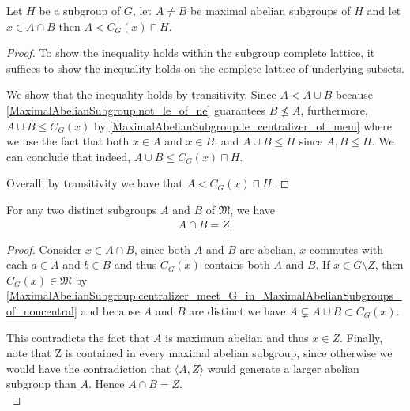 \begin{lemma}
  \label{MaximalAbelianSubgroup.lt_cen_meet_G}
  \leanok
  Let $H$ be a subgroup of $G$, let $A \ne B$ be maximal abelian subgroups of $H$ and let $x \in A \cap B$ then $A < C_G(x) \sqcap H$.
\end{lemma}
\begin{proof}
  \leanok
  To show the inequality holds within the subgroup complete lattice, 
  it suffices to show the inequality holds on the complete lattice of underlying subsets.
  
  We show that the inequality holds by transitivity. 
  Since $A < A \cup B$ because \ref{MaximalAbelianSubgroup.not_le_of_ne} guarantees $B \not\le A$, 
  furthermore, $A \cup B \le C_G(x)$ by \ref{MaximalAbelianSubgroup.le_centralizer_of_mem} where we use the fact that
  both $x \in A$ and $x \in B$; and $A \cup B \le H$ since  $A, B \le H$. We can conclude that indeed, $A \cup B \le C_G(x) \sqcap H$.
  
  Overall, by transitivity we have that $A < C_G(x) \sqcap H$.

\end{proof}


\begin{theorem}
  \label{MaximalAbelianSubgroup.center_eq_meet_of_ne_MaximalAbelianSubgroups}
For any two distinct subgroups $A$ and $B$ of $\mathfrak{M}$, we have
\begin{align*} A \cap B = Z. \end{align*}
\end{theorem}
\begin{proof}
  \leanok
  Consider $x \in A \cap B$, since both $A$ and $B$ are abelian, $x$ commutes with each $a \in A$ and $b \in B$ and thus $C_G(x)$ contains both $A$ and $B$.  If $x \in G \setminus Z$, then $C_G(x) \in \mathfrak{M}$ by \ref{MaximalAbelianSubgroup.centralizer_meet_G_in_MaximalAbelianSubgroups_of_noncentral} and because $A$ and $B$ are distinct we have $A \subsetneq A \cup B \subset C_G(x)$. 
  
  This contradicts the fact that $A$ is maximum abelian and thus $x \in Z$. Finally, note that Z is contained in every maximal abelian subgroup, since otherwise we would have the contradiction that $\langle A, Z \rangle$ would generate a larger abelian subgroup than $A$. Hence $A \cap B = Z$. \\
\end{proof}


